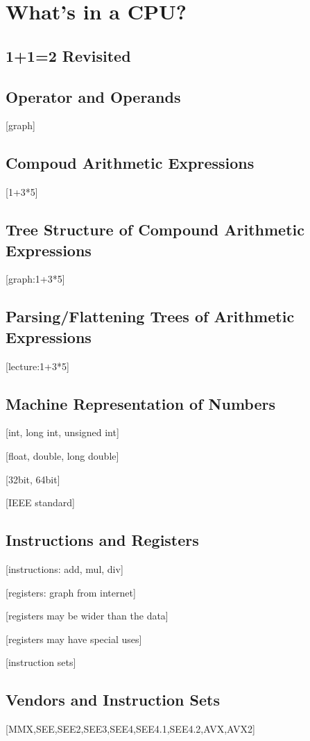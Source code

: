 \documentclass[main]{subfiles}
\begin{document}
\section{What's in a CPU?}
\subsection{1+1=2 Revisited}
\subsection{Operator and Operands}
[graph]
\subsection{Compoud Arithmetic Expressions}
[1+3*5]
\subsection{Tree Structure of Compound Arithmetic Expressions}
[graph:1+3*5]
\subsection{Parsing/Flattening Trees of Arithmetic Expressions}
[lecture:1+3*5] 

\subsection{Machine Representation of Numbers}
[int, long int, unsigned int]

[float, double, long double]

[32bit, 64bit]

[IEEE standard]
\subsection{Instructions and Registers}
[instructions: add, mul, div]

[registers: graph from internet]

[registers may be wider than the data]

[registers may have special uses]

[instruction sets]
\subsection{Vendors and Instruction Sets}
[MMX,SEE,SEE2,SEE3,SEE4,SEE4.1,SEE4.2,AVX,AVX2]
\end{document}

